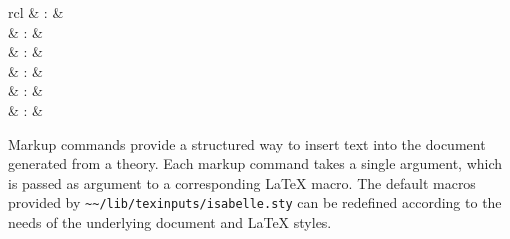 \begin{isabellebody}
\begin{isamarkuptext}
\begin{matharray}{rcl}
    \hypertarget{command.text-raw}{\hyperlink{command.text-raw}{\mbox{}}} & : &  \\[0.5ex]
    \hypertarget{command.sect}{\hyperlink{command.sect}{\mbox{}}} & : &  \\
    \hypertarget{command.subsect}{\hyperlink{command.subsect}{\mbox{}}} & : &  \\
    \hypertarget{command.subsubsect}{\hyperlink{command.subsubsect}{\mbox{}}} & : &  \\
    \hypertarget{command.txt}{\hyperlink{command.txt}{\mbox{}}} & : &  \\
    \hypertarget{command.txt-raw}{\hyperlink{command.txt-raw}{\mbox{}}} & : &  \\
  \end{matharray}

  Markup commands provide a structured way to insert text into the
  document generated from a theory.  Each markup command takes a
  single \hyperlink{syntax.text}{\mbox{}} argument, which is passed as argument to a
  corresponding {\LaTeX} macro.  The default macros provided by
  \verb|~~/lib/texinputs/isabelle.sty| can be redefined according
  to the needs of the underlying document and {\LaTeX} styles.


\end{isamarkuptext}
\end{isabellebody}
